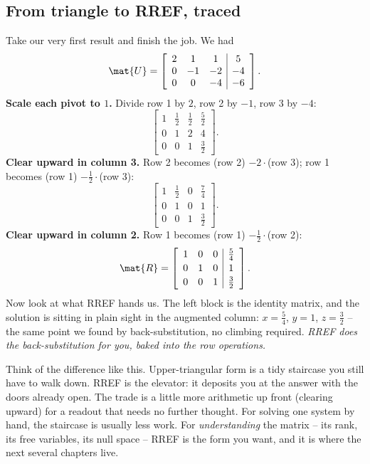 \subsection{From triangle to RREF, traced}

Take our very first result and finish the job. We had
\[
\mat{U}=\left[\begin{array}{ccc|c}
2 & 1 & 1 & 5\\
0 & -1 & -2 & -4\\
0 & 0 & -4 & -6
\end{array}\right].
\]
\textbf{Scale each pivot to $1$.} Divide row 1 by $2$, row 2 by $-1$, row 3 by
$-4$:
\[
\left[\begin{array}{ccc|c}
1 & \tfrac12 & \tfrac12 & \tfrac52\\[2pt]
0 & 1 & 2 & 4\\[2pt]
0 & 0 & 1 & \tfrac32
\end{array}\right].
\]
\textbf{Clear upward in column 3.} Row 2 becomes (row 2) $-2\cdot$(row 3); row 1
becomes (row 1) $-\tfrac12\cdot$(row 3):
\[
\left[\begin{array}{ccc|c}
1 & \tfrac12 & 0 & \tfrac74\\[2pt]
0 & 1 & 0 & 1\\[2pt]
0 & 0 & 1 & \tfrac32
\end{array}\right].
\]
\textbf{Clear upward in column 2.} Row 1 becomes (row 1) $-\tfrac12\cdot$(row 2):
\[
\mat{R}=\left[\begin{array}{ccc|c}
1 & 0 & 0 & \tfrac54\\[2pt]
0 & 1 & 0 & 1\\[2pt]
0 & 0 & 1 & \tfrac32
\end{array}\right].
\]
Now look at what RREF hands us. The left block is the identity matrix, and the
solution is sitting in plain sight in the augmented column: $x=\tfrac54$,
$y=1$, $z=\tfrac32$ -- the same point we found by back-substitution, no climbing
required. \emph{RREF does the back-substitution for you, baked into the row
operations.}

\begin{intuitionbox}
Think of the difference like this. Upper-triangular form is a tidy staircase you
still have to walk down. RREF is the elevator: it deposits you at the answer with
the doors already open. The trade is a little more arithmetic up front (clearing
upward) for a readout that needs no further thought. For solving one system by
hand, the staircase is usually less work. For \emph{understanding} the matrix --
its rank, its free variables, its null space -- RREF is the form you want, and it
is where the next several chapters live.
\end{intuitionbox}

